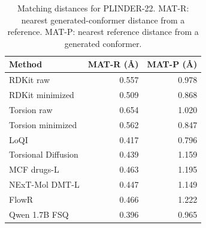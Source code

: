 \begin{table}[htbp]
\centering\small
\caption{Matching distances for PLINDER-22. MAT-R: nearest generated-conformer distance from a reference. MAT-P: nearest reference distance from a generated conformer.}
\label{tab:supporting-druglike}
\begin{tabular}{lrr}
\toprule
Method & MAT-R (\AA{}) & MAT-P (\AA{}) \\
\midrule
RDKit raw & 0.557 & 0.978 \\
RDKit minimized & 0.509 & 0.868 \\
Torsion raw & 0.654 & 1.020 \\
Torsion minimized & 0.562 & 0.847 \\
LoQI & 0.417 & 0.796 \\
Torsional Diffusion & 0.439 & 1.159 \\
MCF drugs-L & 0.463 & 1.195 \\
NExT-Mol DMT-L & 0.447 & 1.149 \\
FlowR & 0.466 & 1.222 \\
Qwen 1.7B FSQ & 0.396 & 0.965 \\
\bottomrule
\end{tabular}
\end{table}
